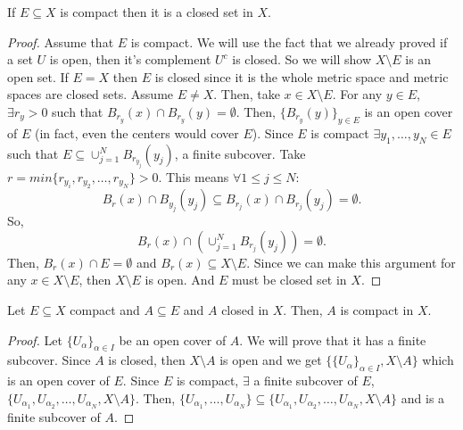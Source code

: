 \documentclass[a4paper]{article}
\begin{document}
\begin{prop}
  If $E \subseteq X$ is compact then it is a closed set in $X$. 

  \begin{proof}
    Assume that $E$ is compact. We will use the fact that we already proved if a set $U$ is open, then it's complement
    $U^c$ is closed. So we will show $X \setminus E$ is an open set. If $E = X$ then  $E$ is closed since it is 
    the whole metric space and metric spaces are closed sets. Assume $E \neq X$. Then, take  $x \in X \setminus E$.
    For any $y \in E$,  $\exists r_y > 0$ such that $B_{r_y}(x) \cap B_{r_y}(y) = \emptyset$. Then,
    $\{B_{r_y} (y)\}_{y \in E} $ is an open cover of $E$ (in fact, even the centers would cover $E$). Since
    $E$ is compact  $\exists y_1, \ldots, y_N \in E$ such that $E \subseteq \cup_{j=1}^N B_{r_{y_j}} (y_j)$, a finite
    subcover.  Take $r = min \{r_{y_i}, r_{y_2}, \ldots, r_{y_N}\} > 0$. This means $\forall 1 \leq j \leq N$:
     \[
    B_r(x) \cap B_{y_j}(y_j) \subseteq B_{r_j} (x) \cap B_{r_j}(y_j) = \emptyset
    .\]
    So,
    \[
      B_r(x) \cap (\cup_{j=1}^N B_{r_j}(y_j)) = \emptyset
    .\] Then,
  $B_r(x) \cap E = \emptyset$ and  $B_r(x) \subseteq X \setminus E$. Since we can make this argument for any
  $x \in X \setminus E$, then $X \setminus E$ is open. And $E$ must be closed set in $X$.
  \end{proof}
\end{prop}

\begin{prop}
  Let $E \subseteq X$ compact and  $A \subseteq E$ and $A$ closed in  $X$. Then, $A$ is compact in $X$. 
  \begin{proof}
  Let $\{ U_\alpha\}_{\alpha \in I}$ be an open cover of $A$. We will prove that it has a finite subcover. 
Since $A$ is closed, then  $X \setminus A$ is open and we get $\{\{U_{\alpha} \}_{\alpha \in I} , X \setminus A \}$
    which is an open cover of $E$. Since  $E$ is compact,  $\exists $ a finite subcover of $E$, 
    $\{U_{\alpha_1}, U_{\alpha_2}, \ldots, U_{\alpha_N}, X\setminus A\}$. Then, $\{U_{\alpha_1}, \ldots, U_{\alpha_N} \}
     \subseteq \{U_{\alpha_1}, U_{\alpha_2}, \ldots, U_{\alpha_N}, X\setminus A\}$ and is a finite subcover of
    $A$.  
  \end{proof}
\end{prop}
\end{document}
